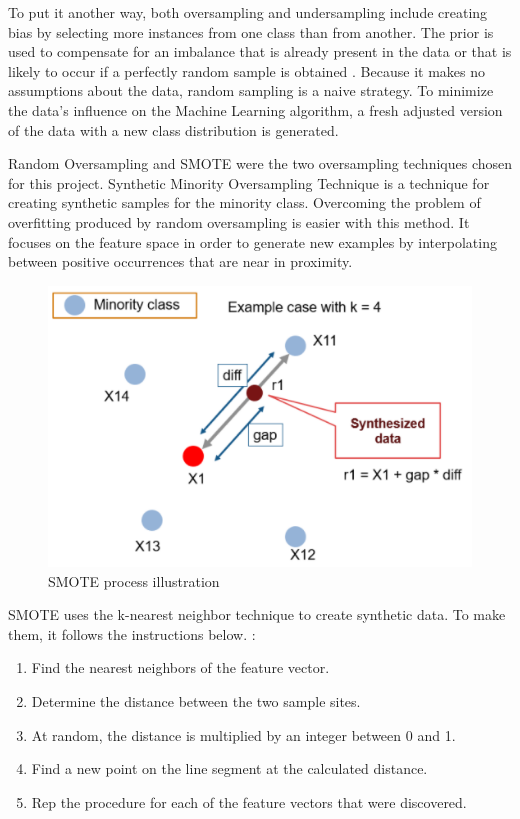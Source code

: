 To put it another way, both oversampling and undersampling include creating bias by selecting more instances from one class than from another. The prior is used to compensate for an imbalance that is already present in the data or that is likely to occur if a perfectly random sample is obtained \cite{smote2}. Because it makes no assumptions about the data, random sampling is a naive strategy. To minimize the data's influence on the Machine Learning algorithm, a fresh adjusted version of the data with a new class distribution is generated.

Random Oversampling and SMOTE were the two oversampling techniques chosen for this project. Synthetic Minority Oversampling Technique is a technique for creating synthetic samples for the minority class. Overcoming the problem of overfitting produced by random oversampling is easier with this method. It focuses on the feature space in order to generate new examples by interpolating between positive occurrences that are near in proximity.

\begin{figure}[H]
\centering
\includegraphics[scale=0.7]{img/SMOTE.PNG}
\caption{SMOTE process illustration}
\label{fig:smoteproc}
\end{figure}

SMOTE uses the k-nearest neighbor technique to create synthetic data. To make them, it follows the instructions below. \cite{smote1}:

\begin{enumerate}
    \item Find the nearest neighbors of the feature vector.
    \item Determine the distance between the two sample sites.
    \item At random, the distance is multiplied by an integer between 0 and 1.
    \item Find a new point on the line segment at the calculated distance.
    \item Rep the procedure for each of the feature vectors that were discovered.
\end{enumerate}

